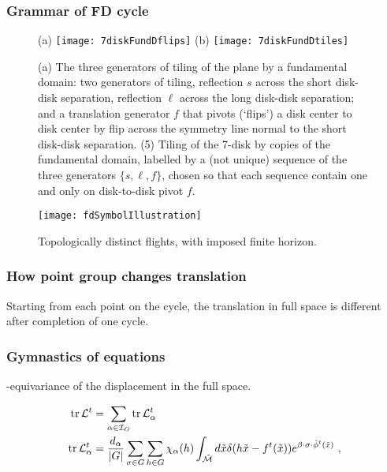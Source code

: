 \documentclass[aps,pre,preprint,groupedaddress, floatfix]{revtex4-1}
\begin{document}
\subsubsection{Grammar of FD cycle}
\begin{figure}
\begin{center}
(a) \texttt{[image: 7diskFundDflips]}
(b) \texttt{[image: 7diskFundDtiles]}
\end{center}
\caption{\label{fig:7diskFundDflips}
(a) The three generators of tiling of the plane by a fundamental domain:
two generators of  tiling, reflection $s$ across the short
disk-disk separation, reflection  $\ell$  across the long disk-disk
separation;
and
a translation generator $f$ that pivots (`flips') a disk center to disk
center by flip across the symmetry line normal to the short disk-disk
separation.
(5) Tiling of the 7-disk by copies of the fundamental domain, labelled
by a (not unique) sequence of the three generators
$\{s,\ell,f\}$, chosen so that each sequence contain one and only on
    disk-to-disk pivot $f$.
}
\end{figure}

\begin{figure}[htbp]
\texttt{[image: fdSymbolIllustration]}
\caption{\label{fig:fdflights}
Topologically distinct flights, with imposed finite horizon.
}
\end{figure}

\subsubsection{How point group changes translation}
Starting from each point on the cycle, the translation in full space is
different after completion of one cycle.


\subsubsection{Gymnastics of equations}

\Group-equivariance of the displacement in the full space.

\begin{align}
\mbox{\rm tr}\,{\cal L}^t &=
\sum_{\alpha \in{\cal I}_G} \mbox{\rm tr}\,{\cal L}_{\alpha}^t\nonumber\\
\mbox{\rm tr}\,{\cal L}_{\alpha}^t &=
\frac{d_\alpha}{|G|}\sum_{\sigma \in G}\sum_{h\in G}\chi_\alpha(h)
\int_{\tilde {\cal M}} d\tilde x \delta (h\tilde x - f^t(\tilde x))
e^{\beta\cdot\sigma\cdot\hat \phi^t(\tilde x)}~,
\label{e1}
\end{align}
\end{document}
